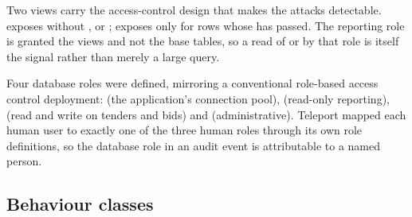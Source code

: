 {\sloppy Two views carry the access-control design that makes the attacks detectable.
 exposes  without ,
 or ;  exposes
 only for rows whose  has passed. The reporting role is
granted the views and not the base tables, so a read of  or
 by that role is itself the signal rather than merely a large query.\par}

Four database roles were defined, mirroring a conventional role-based access
control deployment:  (the application's connection pool),
 (read-only reporting),  (read and write on
tenders and bids) and  (administrative). Teleport mapped each human user
to exactly one of the three human roles through its own role definitions, so the
database role in an audit event is attributable to a named person.

\subsection{Behaviour classes}
\label{app:scenarios:classes}


